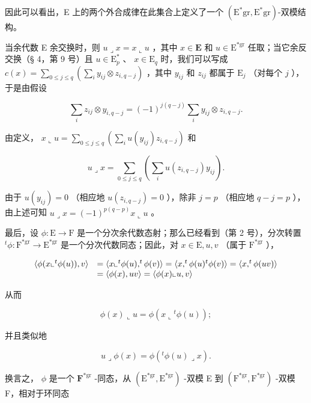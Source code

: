 因此可以看出，E 上的两个外合成律在此集合上定义了一个 \((\mathrm{E}^{*}\mathrm{gr}, \mathrm{E}^{*}\mathrm{gr})\)-双模结构。

当余代数 E 余交换时，则 \(u \lrcorner x = x \llcorner u\) ，其中 \(x \in \mathbf{E}\) 和 \(u \in \mathrm{E}^{*\mathrm{gr}}\) 任取；当它余反交换（§ 4，第 9 号）且 \(u \in \mathrm{E}_p^*\) 、 \(x \in \mathrm{E}_q\) 时，我们可以写成 \(c(x) = \sum_{0 \leqslant j \leqslant q} \left( \sum_i y_{ij} \otimes z_{i,q-j} \right)\) ，其中 \(y_{ij}\) 和 \(z_{ij}\) 都属于 \(\mathrm{E}_j\) （对每个 \(j\) ），于是由假设

\[
\sum_ {i} z _ {i j} \otimes y _ {i, q - j} = (- 1) ^ {j (q - j)} \sum_ {i} y _ {i j} \otimes z _ {i, q - j}.
\]

由定义， \(x \llcorner u = \sum_{0 \leqslant j \leqslant q} \left( \sum_{i} u(y_{ij}) z_{i,q-j} \right)\) 和

\[
u \lrcorner x = \sum_ {0 \leqslant j \leqslant q} \left(\sum_ {i} u (z _ {i, q - j}) y _ {i j}\right).
\]

由于 \(u(y_{ij}) = 0\) （相应地 \(u(z_{i,q-j}) = 0\) ），除非 \(j = p\) （相应地 \(q - j = p\) ），由上述可知 \(u \lrcorner x = (-1)^{p(q-p)}x \llcorner u\) 。

最后，设 \(\phi: \mathrm{E} \to \mathrm{F}\) 是一个分次余代数态射；那么已经看到（第 2 号），分次转置 \(^t\phi: \mathrm{F}^{*\mathrm{gr}} \to \mathrm{E}^{*\mathrm{gr}}\) 是一个分次代数同态；因此，对 \(x \in \mathrm{E}, u, v\) （属于 \(\mathrm{F}^{*\mathrm{gr}}\) ），

\[
\begin{array}{r l} \langle \phi (x \llcorner {} ^ {t} \phi (u)), v \rangle & = \langle x \llcorner {} ^ {t} \phi (u), ^ {t} \phi (v) \rangle = \langle x, ^ {t} \phi (u) ^ {t} \phi (v) \rangle = \langle x, ^ {t} \phi (u v) \rangle \\ & = \langle \phi (x), u v \rangle = \langle \phi (x) \llcorner u, v \rangle \end{array}
\]

从而

\[
\phi (x) \llcorner u = \phi (x \llcorner {} ^ {t} \phi (u));\tag{55}
\]

并且类似地

\[
u \lrcorner \phi (x) = \phi (^ {t} \phi (u) \lrcorner x).\tag{56}
\]

换言之， \(\phi\) 是一个 \(\mathbf{F}^{*\mathrm{gr}}\) -同态，从 \((\mathrm{E}^{*\mathrm{gr}}, \mathrm{E}^{*\mathrm{gr}})\) -双模 E 到 \((\mathrm{F}^{*\mathrm{gr}}, \mathrm{F}^{*\mathrm{gr}})\) -双模 F，相对于环同态

